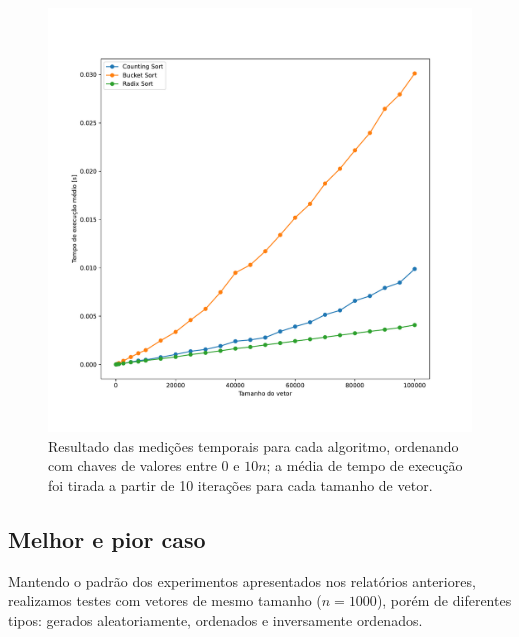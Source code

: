 \documentclass[fontsize=10pt]{article}
\begin{document}
\begin{figure}[H]
\begin{center}
    \includegraphics[scale=0.4]{imagens/0602.pdf}
    \caption{Resultado das medições temporais para cada algoritmo, ordenando com chaves de valores entre 0 e $10n$; a média de tempo de execução foi tirada a partir de 10 iterações para cada tamanho de vetor.}
    \label{Figura 3}
\end{center}
\end{figure}

\subsection{Melhor e pior caso}

\quad Mantendo o padrão dos experimentos apresentados nos relatórios anteriores\cite{relatorio1}\cite{relatorio2}, realizamos testes com vetores de mesmo tamanho ($n = 1000$), porém de diferentes tipos: gerados aleatoriamente, ordenados e inversamente ordenados.
\end{document}
